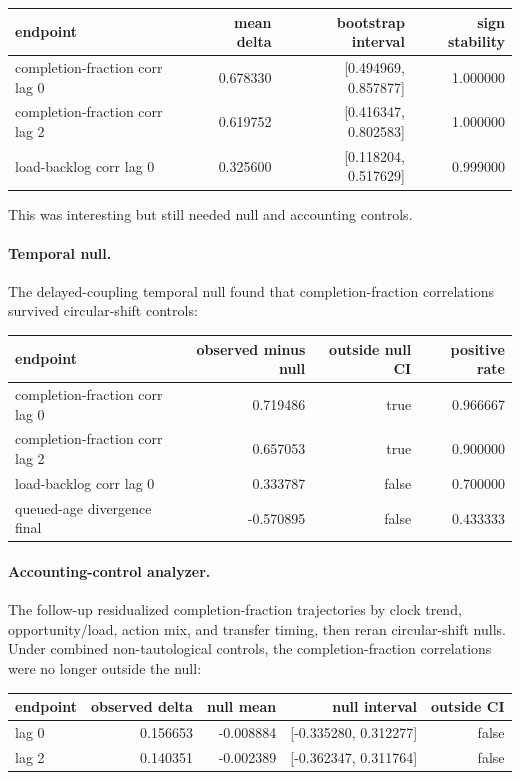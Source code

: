 \documentclass[11pt]{article}
\begin{document}
\begin{center}
\begin{tabular}{lrrr}
endpoint & mean delta & bootstrap interval & sign stability \\
\hline
completion-fraction corr lag 0 & 0.678330 & [0.494969, 0.857877] & 1.000000 \\
completion-fraction corr lag 2 & 0.619752 & [0.416347, 0.802583] & 1.000000 \\
load-backlog corr lag 0 & 0.325600 & [0.118204, 0.517629] & 0.999000
\end{tabular}
\end{center}

This was interesting but still needed null and accounting controls.

\paragraph{Temporal null.}
The delayed-coupling temporal null found that completion-fraction correlations
survived circular-shift controls:

\begin{center}
\begin{tabular}{lrrr}
endpoint & observed minus null & outside null CI & positive rate \\
\hline
completion-fraction corr lag 0 & 0.719486 & true & 0.966667 \\
completion-fraction corr lag 2 & 0.657053 & true & 0.900000 \\
load-backlog corr lag 0 & 0.333787 & false & 0.700000 \\
queued-age divergence final & -0.570895 & false & 0.433333
\end{tabular}
\end{center}

\paragraph{Accounting-control analyzer.}
The follow-up residualized completion-fraction trajectories by clock trend,
opportunity/load, action mix, and transfer timing, then reran circular-shift
nulls. Under combined non-tautological controls, the completion-fraction
correlations were no longer outside the null:

\begin{center}
\begin{tabular}{lrrrr}
endpoint & observed delta & null mean & null interval & outside CI \\
\hline
lag 0 & 0.156653 & -0.008884 & [-0.335280, 0.312277] & false \\
lag 2 & 0.140351 & -0.002389 & [-0.362347, 0.311764] & false
\end{tabular}
\end{center}
\end{document}
